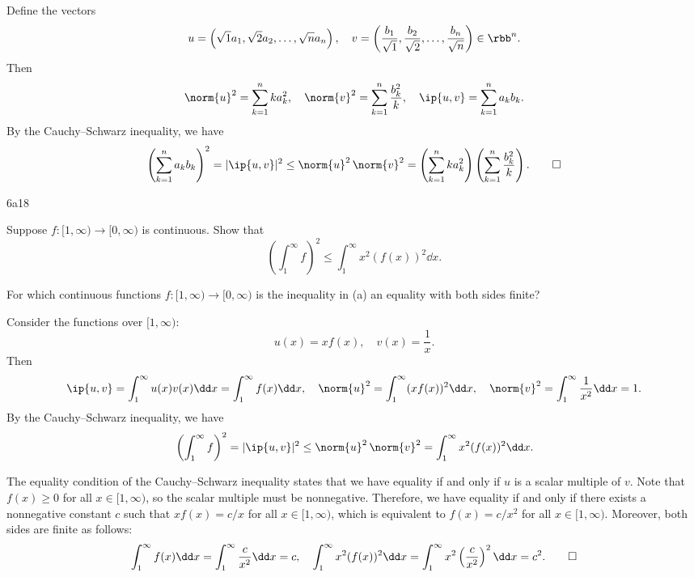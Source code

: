 \begin{sol}
    Define the vectors
    \[
        u = \left(\sqrt{1}a_1, \sqrt{2}a_2, \ldots, \sqrt{n}a_n\right), \quad v = \left(\frac{b_1}{\sqrt{1}}, \frac{b_2}{\sqrt{2}}, \ldots, \frac{b_n}{\sqrt{n}}\right) \in \rbb^n.
    \]
    Then
    \[
        \norm{u}^2 = \sum_{k=1}^{n} k a_k^2, \quad \norm{v}^2 = \sum_{k=1}^{n} \frac{b_k^2}{k}, \quad \ip{u, v} = \sum_{k=1}^{n} a_k b_k.
    \]
    By the Cauchy--Schwarz inequality, we have
    \[
        \left(\sum_{k=1}^{n} a_k b_k\right)^2 = |\ip{u, v}|^2 \leq \norm{u}^2\,\norm{v}^2 = \left(\sum_{k=1}^{n} k a_k^2\right)\left(\sum_{k=1}^{n} \frac{b_k^2}{k}\right). \qedhere
    \]
\end{sol}

\begin{exercise}{6a18}
    \begin{subexercises}
        \item Suppose $f: [1, \infty) \to [0, \infty)$ is continuous.
        Show that
        \[
            \left(\int_1^{\infty} f\right)^2 \leq \int_1^{\infty} x^2(f(x))^2 \dd x.
        \]
        \item For which continuous functions $f: [1, \infty) \to [0, \infty)$ is the inequality in (a) an equality with both sides finite?
    \end{subexercises}
\end{exercise}

\begin{solenum}
    \item Consider the functions over $[1, \infty)$:
    \[
        u(x) = x f(x), \quad v(x) = \frac{1}{x}.
    \]
    Then
    \[
        \ip{u, v} = \int_1^{\infty} u(x)v(x) \dd x = \int_1^{\infty} f(x) \dd x, \quad \norm{u}^2 = \int_1^{\infty} (x f(x))^2 \dd x, \quad \norm{v}^2 = \int_1^{\infty} \frac{1}{x^2} \dd x = 1.
    \]
    By the Cauchy--Schwarz inequality, we have
    \[
        \left(\int_1^{\infty} f\right)^2 = |\ip{u, v}|^2 \leq \norm{u}^2\,\norm{v}^2 = \int_1^{\infty} x^2(f(x))^2 \dd x.
    \]
    \item The equality condition of the Cauchy--Schwarz inequality states that we have equality if and only if $u$ is a scalar multiple of $v$.
    Note that $f(x) \geq 0$ for all $x \in [1, \infty)$, so the scalar multiple must be nonnegative.
    Therefore, we have equality if and only if there exists a nonnegative constant $c$ such that $x f(x) = c/x$ for all $x \in [1, \infty)$, which is equivalent to $f(x) = c/x^2$ for all $x \in [1, \infty)$.
    Moreover, both sides are finite as follows:
    \[
        \int_1^{\infty} f(x) \dd x = \int_1^{\infty} \frac{c}{x^2} \dd x = c, \quad \int_1^{\infty} x^2(f(x))^2 \dd x = \int_1^{\infty} x^2\left(\frac{c}{x^2}\right)^2 \dd x = c^2. \qedhere
    \]
\end{solenum}


